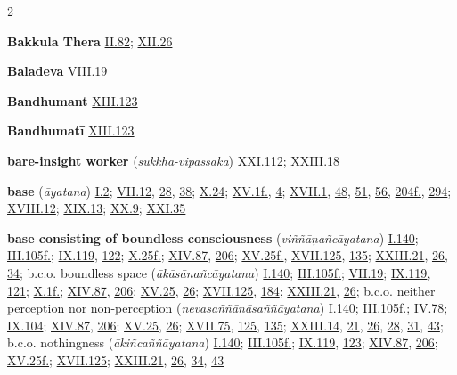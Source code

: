 \begin{multicols}{2}
\begin{vismHanging}
\par\textbf{Bakkula Thera} \hyperlink{II.82}{II.82}{}; \hyperlink{XII.26}{XII.26}{}
\par\textbf{Baladeva} \hyperlink{VIII.19}{VIII.19}{}
\par\textbf{Bandhumant} \hyperlink{XIII.123}{XIII.123}{}
\par\textbf{Bandhumatī} \hyperlink{XIII.123}{XIII.123}{}
\par\textbf{bare-insight worker} (\emph{sukkha-vipassaka}) \hyperlink{XXI.112}{XXI.112}{}; \hyperlink{XXIII.18}{XXIII.18}{}
\par\textbf{base} (\emph{āyatana}) \hyperlink{I.2}{I.2}{}; \hyperlink{VII.12}{VII.12}{}, \hyperlink{VII.28}{28}{}, \hyperlink{VII.38}{38}{}; \hyperlink{X.24}{X.24}{}; \hyperlink{XV.1}{XV.1f.}{}, \hyperlink{XV.4}{4}{}; \hyperlink{XVII.1}{XVII.1}{}, \hyperlink{XVII.48}{48}{}, \hyperlink{XVII.51}{51}{}, \hyperlink{XVII.56}{56}{}, \hyperlink{XVII.204}{204f.}{}, \hyperlink{XVII.294}{294}{}; \hyperlink{XVIII.12}{XVIII.12}{}; \hyperlink{XIX.13}{XIX.13}{}; \hyperlink{XX.9}{XX.9}{}; \hyperlink{XXI.35}{XXI.35}{}
\par\textbf{base consisting of boundless consciousness} (\emph{viññāṇañcāyatana}) \hyperlink{I.140}{I.140}{}; \hyperlink{III.105}{III.105f.}{}; \hyperlink{IX.119}{IX.119}{}, \hyperlink{IX.122}{122}{}; \hyperlink{X.25}{X.25f.}{}; \hyperlink{XIV.87}{XIV.87}{}, \hyperlink{XIV.206}{206}{}; \hyperlink{XV.25}{XV.25f.}{}, \hyperlink{XVII.125}{XVII.125}{}, \hyperlink{XVII.135}{135}{}; \hyperlink{XXIII.21}{XXIII.21}{}, \hyperlink{XXIII.26}{26}{}, \hyperlink{XXIII.34}{34}{}; b.c.o. boundless space (\emph{ākāsānañcāyatana}) \hyperlink{I.140}{I.140}{}; \hyperlink{III.105}{III.105f.}{}; \hyperlink{VII.19}{VII.19}{}; \hyperlink{IX.119}{IX.119}{}, \hyperlink{IX.121}{121}{}; \hyperlink{X.1}{X.1f.}{}; \hyperlink{XIV.87}{XIV.87}{}, \hyperlink{XIV.206}{206}{}; \hyperlink{XV.25}{XV.25}{}, \hyperlink{XV.26}{26}{}; \hyperlink{XVII.125}{XVII.125}{}, \hyperlink{XVII.184}{184}{}; \hyperlink{XXIII.21}{XXIII.21}{}, \hyperlink{XXIII.26}{26}{}; b.c.o. neither perception nor non-perception (\emph{nevasaññānāsaññāyatana}) \hyperlink{I.140}{I.140}{}; \hyperlink{III.105}{III.105f.}{}; \hyperlink{IV.78}{IV.78}{}; \hyperlink{IX.104}{IX.104}{}; \hyperlink{XIV.87}{XIV.87}{}, \hyperlink{XIV.206}{206}{}; \hyperlink{XV.25}{XV.25}{}, \hyperlink{XV.26}{26}{}; \hyperlink{XVII.75}{XVII.75}{}, \hyperlink{XVII.125}{125}{}, \hyperlink{XVII.135}{135}{}; \hyperlink{XXIII.14}{XXIII.14}{}, \hyperlink{XXIII.21}{21}{}, \hyperlink{XXIII.26}{26}{}, \hyperlink{XXIII.28}{28}{}, \hyperlink{XXIII.31}{31}{}, \hyperlink{XXIII.43}{43}{}; b.c.o. nothingness (\emph{ākiñcaññāyatana}) \hyperlink{I.140}{I.140}{}; \hyperlink{III.105}{III.105f.}{}; \hyperlink{IX.119}{IX.119}{}, \hyperlink{IX.123}{123}{}; \hyperlink{XIV.87}{XIV.87}{}, \hyperlink{XIV.206}{206}{}; \hyperlink{XV.25}{XV.25f.}{}; \hyperlink{XVII.125}{XVII.125}{}; \hyperlink{XXIII.21}{XXIII.21}{}, \hyperlink{XXIII.26}{26}{}, \hyperlink{XXIII.34}{34}{}, \hyperlink{XXIII.43}{43}{}

\end{vismHanging}
\end{multicols}
